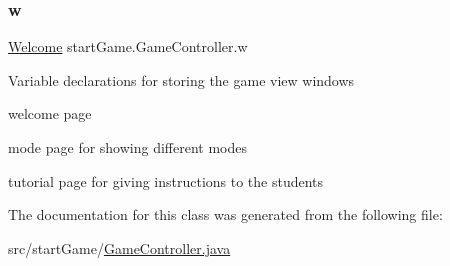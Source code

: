 \subsubsection{\texorpdfstring{w}{w}}
{\footnotesize\ttfamily \hyperlink{classview_1_1_welcome}{Welcome} start\+Game.\+Game\+Controller.\+w\hspace{0.3cm}{\ttfamily [private]}}

Variable declarations for storing the game view windows
\begin{DoxyItemize}
\item welcome page
\item mode page for showing different modes
\item tutorial page for giving instructions to the students 
\end{DoxyItemize}

The documentation for this class was generated from the following file\+:\begin{DoxyCompactItemize}
\item 
src/start\+Game/\hyperlink{_game_controller_8java}{Game\+Controller.\+java}\end{DoxyCompactItemize}
